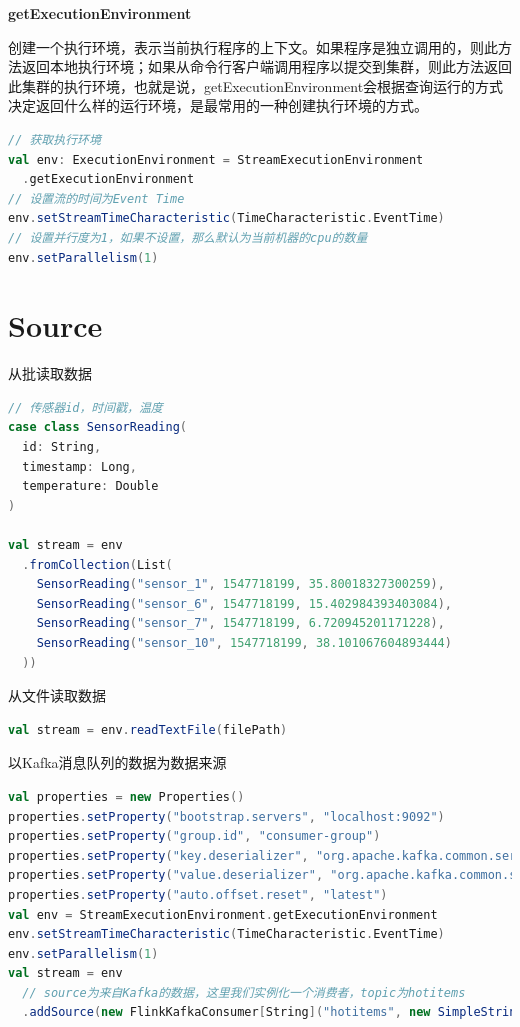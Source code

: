 \documentclass[oneside]{ctexbook}
\begin{document}
\textbf{getExecutionEnvironment}

创建一个执行环境，表示当前执行程序的上下文。如果程序是独立调用的，则此方法返回本地执行环境；如果从命令行客户端调用程序以提交到集群，则此方法返回此集群的执行环境，也就是说，getExecutionEnvironment会根据查询运行的方式决定返回什么样的运行环境，是最常用的一种创建执行环境的方式。

\begin{lstlisting}[language=scala, breaklines]
// 获取执行环境
val env: ExecutionEnvironment = StreamExecutionEnvironment
  .getExecutionEnvironment
// 设置流的时间为Event Time
env.setStreamTimeCharacteristic(TimeCharacteristic.EventTime)
// 设置并行度为1，如果不设置，那么默认为当前机器的cpu的数量
env.setParallelism(1)
\end{lstlisting}

\section{Source}

从批读取数据

\begin{lstlisting}[language=scala, breaklines]
// 传感器id，时间戳，温度
case class SensorReading(
  id: String,
  timestamp: Long,
  temperature: Double
)

val stream = env
  .fromCollection(List(
    SensorReading("sensor_1", 1547718199, 35.80018327300259),
    SensorReading("sensor_6", 1547718199, 15.402984393403084),
    SensorReading("sensor_7", 1547718199, 6.720945201171228),
    SensorReading("sensor_10", 1547718199, 38.101067604893444)
  ))
\end{lstlisting}

从文件读取数据

\begin{lstlisting}[language=scala, breaklines]
val stream = env.readTextFile(filePath)
\end{lstlisting}

以Kafka消息队列的数据为数据来源

\begin{lstlisting}[language=scala, breaklines]
val properties = new Properties()
properties.setProperty("bootstrap.servers", "localhost:9092")
properties.setProperty("group.id", "consumer-group")
properties.setProperty("key.deserializer", "org.apache.kafka.common.serialization.StringDeserializer")
properties.setProperty("value.deserializer", "org.apache.kafka.common.serialization.StringDeserializer")
properties.setProperty("auto.offset.reset", "latest")
val env = StreamExecutionEnvironment.getExecutionEnvironment
env.setStreamTimeCharacteristic(TimeCharacteristic.EventTime)
env.setParallelism(1)
val stream = env
  // source为来自Kafka的数据，这里我们实例化一个消费者，topic为hotitems
  .addSource(new FlinkKafkaConsumer[String]("hotitems", new SimpleStringSchema(), properties))
\end{lstlisting}
\end{document}
